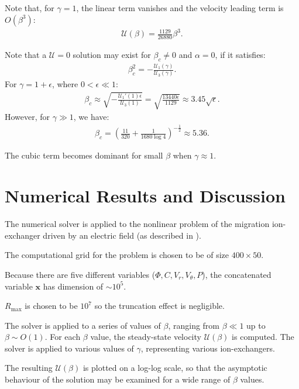 \documentclass[final]{elsarticle}
\newcommand\eps \epsilon
\newcommand{\pars}[1]{\left(#1\right)}
\newcommand\bx{\boldsymbol{x}}
\newcommand\cU{\mathscr{U}}
\begin{document}
Note that, for $\gamma = 1$, the linear term vanishes and the velocity leading term is $O(\beta^3)$:
\begin{eqnarray*}
\cU(\beta) = \frac{1129}{26880}\beta^3.
\end{eqnarray*}

Note that a $\cU = 0$ solution may exist for $\beta_c \ne 0$ and $\alpha = 0$, 
if it satisfies:
\begin{eqnarray*}
\beta_c^2 = -\frac{\cU_1(\gamma)}{\cU_3(\gamma)}.
\end{eqnarray*}
For $\gamma = 1 + \eps$, where $0 < \eps \ll 1$:
\begin{eqnarray*}
\beta_c \approx \sqrt{-\frac{\cU_1'(1) \eps}{\cU_3(1)}} = 
 \sqrt{\frac{13440 \eps}{1129}} \approx 3.45 \sqrt{\eps}.
\end{eqnarray*}
However, for $\gamma \gg 1$, we have:
\begin{eqnarray*}
\beta_c =  \pars{\frac{11}{320} + \frac{1}{1680 \log 4}}^{-\frac{1}{2}} \approx 5.36.
\end{eqnarray*}

The cubic term becomes dominant for small $\beta$ when $\gamma \approx 1$.

\section{Numerical Results and Discussion} \label{sec:results}
The numerical solver is applied to the nonlinear problem of the migration ion-exchanger
driven by an electric field (as described in \cite{yariv2010migration}). 

The computational grid for the problem is chosen to be of size $400 \times 50$.

Because there are five different variables ($\varPhi, C, V_r, V_\theta, P$), the concatenated
variable $\bx$ has dimension of $\sim 10^5$.

$R_{\max}$ is chosen to be $10^{7}$ so the truncation effect is negligible.

The solver is applied to a series of values of $\beta$, ranging 
from $\beta \ll 1$ up to $\beta \sim O(1)$.
For each $\beta$ value, the steady-state velocity $\cU(\beta)$ is computed. The solver
is applied to various values of $\gamma$, representing various ion-exchangers.

The resulting $\cU(\beta)$ is plotted on a log-log scale, so that the asymptotic behaviour
of the solution may be examined for a wide range of $\beta$ values.
\end{document}
